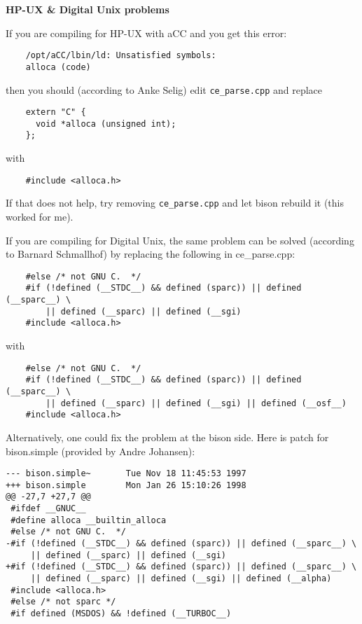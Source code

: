 {\bf HP-UX \& Digital Unix problems}

If you are compiling for HP-UX with aCC and you get this error: 

\footnotesize\begin{verbatim}
    /opt/aCC/lbin/ld: Unsatisfied symbols:
    alloca (code)
\end{verbatim}
\normalsize
 then you should (according to Anke Selig) edit {\tt ce\_\-parse.cpp} and replace 

\footnotesize\begin{verbatim}
    extern "C" {
      void *alloca (unsigned int);
    };
\end{verbatim}
\normalsize
 with 

\footnotesize\begin{verbatim}
    #include <alloca.h>  
\end{verbatim}
\normalsize


If that does not help, try removing {\tt ce\_\-parse.cpp} and let bison rebuild it (this worked for me).

If you are compiling for Digital Unix, the same problem can be solved (according to Barnard Schmallhof) by replacing the following in ce\_\-parse.cpp:



\footnotesize\begin{verbatim}
    #else /* not GNU C.  */
    #if (!defined (__STDC__) && defined (sparc)) || defined (__sparc__) \
        || defined (__sparc) || defined (__sgi)
    #include <alloca.h>
\end{verbatim}
\normalsize


with



\footnotesize\begin{verbatim}
    #else /* not GNU C.  */
    #if (!defined (__STDC__) && defined (sparc)) || defined (__sparc__) \
        || defined (__sparc) || defined (__sgi) || defined (__osf__)
    #include <alloca.h>
\end{verbatim}
\normalsize


Alternatively, one could fix the problem at the bison side. Here is patch for bison.simple (provided by Andre Johansen):



\footnotesize\begin{verbatim}
--- bison.simple~       Tue Nov 18 11:45:53 1997
+++ bison.simple        Mon Jan 26 15:10:26 1998
@@ -27,7 +27,7 @@
 #ifdef __GNUC__
 #define alloca __builtin_alloca
 #else /* not GNU C.  */
-#if (!defined (__STDC__) && defined (sparc)) || defined (__sparc__) \
     || defined (__sparc) || defined (__sgi)
+#if (!defined (__STDC__) && defined (sparc)) || defined (__sparc__) \
     || defined (__sparc) || defined (__sgi) || defined (__alpha)
 #include <alloca.h>
 #else /* not sparc */
 #if defined (MSDOS) && !defined (__TURBOC__)
\end{verbatim}
\normalsize


